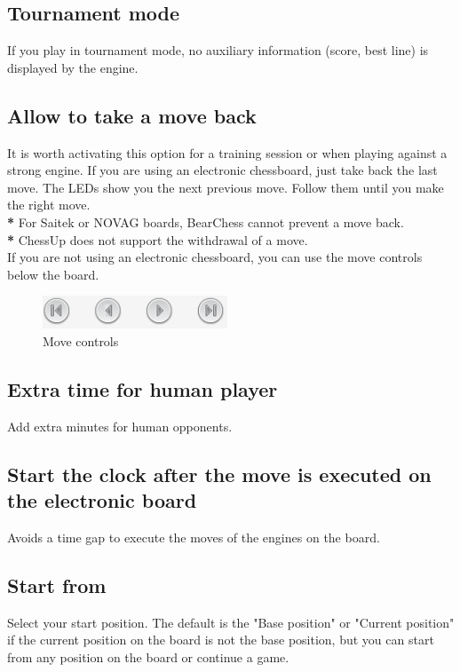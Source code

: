 \documentclass[11pt,a4paper]{article}
\begin{document}
\subsection{Tournament mode}
If you play in tournament mode, no auxiliary information (score, best line) is displayed by the engine.

\subsection{Allow to take a move back}
It is worth activating this option for a training session or when playing against a strong engine. If you are using an electronic chessboard, just take back the last move. The LEDs show you the next previous move. Follow them until you make the right move.\\
{\color{red}\textbf{*}} For Saitek or NOVAG boards, BearChess cannot prevent a move back.\\
{\color{red}\textbf{*}} ChessUp does not support the withdrawal of a move.\\
If you are not using an electronic chessboard, you can use the move controls below the board.

\begin{figure}[H]
	\centering
	\includegraphics[scale=1.0]{MoveControl.png}
	\caption{Move controls}
	\label{fig:MoveControl}
\end{figure}


\subsection{Extra time for human player}
Add extra minutes for human opponents.

\subsection{Start the clock after the move is executed on the electronic board}
Avoids a time gap to execute the moves of the engines on the board.


\subsection{Start from}
Select your start position. The default is the "Base position" or "Current position" if the current position on the board is not the base position, but you can start from any position on the board or continue a game.
\end{document}
